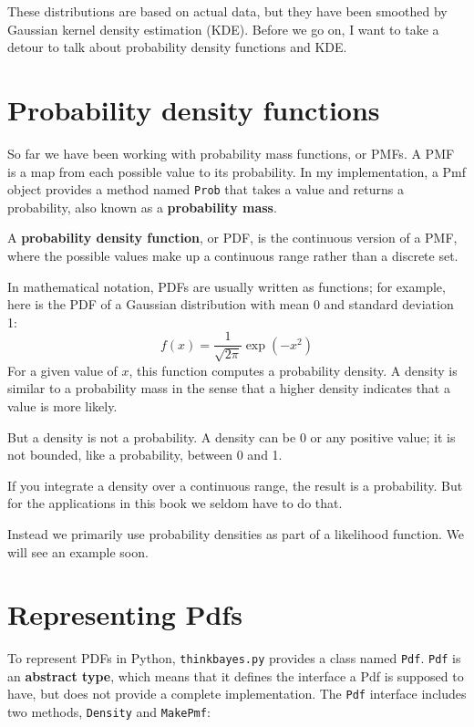 \documentclass[12pt]{book}
\begin{document}
These distributions are based on actual data, but they
have been smoothed by Gaussian kernel density estimation (KDE).
Before we go on, I want to take a detour to talk about 
probability density functions and KDE.


\section{Probability density functions}

So far we have been working with probability mass functions, or PMFs.
A PMF is a map from each possible value to its probability.  In my
implementation, a Pmf object provides a method named {\tt Prob} that
takes a value and returns a probability, also known as a {\bf probability
mass}.

A {\bf probability density function}, or PDF, is the continuous version of a
PMF, where the possible values make up a continuous range rather than
a discrete set.  

In mathematical notation, PDFs are usually written as functions; for
example, here is the PDF of a Gaussian distribution with
mean 0 and standard deviation 1:
%
\[ f(x) = \frac{1}{\sqrt{2 \pi}} \exp(-x^2) \]
%
For a given value of $x$, this function computes a probability
density.  
A density is similar
to a probability mass in the sense that a higher density indicates
that a value is more likely.

But a density is not a probability.  A density can be 0 or any positive
value; it is not bounded, like a probability, between 0 and 1.

If you integrate a density
over a continuous range, the result is a probability.  But 
for the applications in this book we seldom have to do that.

Instead we primarily use probability densities as part
of a likelihood function.  We will see an example soon.


\section{Representing Pdfs}

To represent PDFs in Python,
{\tt thinkbayes.py} provides a class named {\tt Pdf}.
{\tt Pdf} is an {\bf abstract type}, which means that it defines
the interface a Pdf is supposed to have, but does not provide
a complete implementation.  The {\tt Pdf} interface includes
two methods, {\tt Density} and {\tt MakePmf}:
\end{document}
